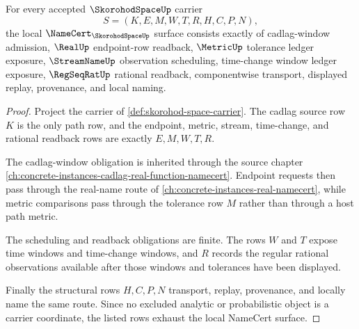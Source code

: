 \begin{theorem}
\label{thm:skorohod-space-namecert-obligations}
For every accepted $\SkorohodSpaceUp$ carrier
$$
S=(K,E,M,W,T,R,H,C,P,N),
$$
the local $\NameCert_{\SkorohodSpaceUp}$ surface consists exactly of cadlag-window admission, $\RealUp$ endpoint-row readback, $\MetricUp$ tolerance ledger exposure, $\StreamNameUp$ observation scheduling, time-change window ledger exposure, $\RegSeqRatUp$ rational readback, componentwise transport, displayed replay, provenance, and local naming.
\end{theorem}
\begin{proof}
Project the carrier of \autoref{def:skorohod-space-carrier}. The cadlag source row $K$ is the only path row, and the endpoint, metric, stream, time-change, and rational readback rows are exactly $E,M,W,T,R$.

The cadlag-window obligation is inherited through the source chapter \autoref{ch:concrete-instances-cadlag-real-function-namecert}. Endpoint requests then pass through the real-name route of \autoref{ch:concrete-instances-real-namecert}, while metric comparisons pass through the tolerance row $M$ rather than through a host path metric.

The scheduling and readback obligations are finite. The rows $W$ and $T$ expose time windows and time-change windows, and $R$ records the regular rational observations available after those windows and tolerances have been displayed.

Finally the structural rows $H,C,P,N$ transport, replay, provenance, and locally name the same route. Since no excluded analytic or probabilistic object is a carrier coordinate, the listed rows exhaust the local NameCert surface.
\end{proof}

